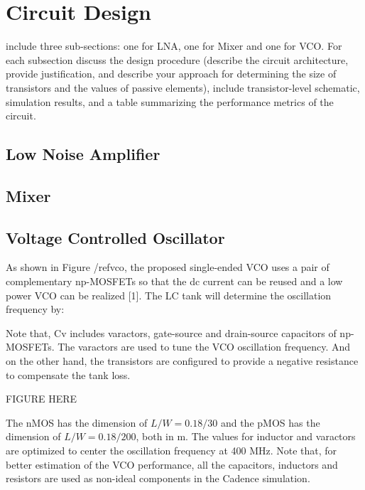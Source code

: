 \section{Circuit Design}
include three sub-sections: one for LNA, one for Mixer and one for VCO. For each subsection discuss the design procedure (describe the circuit architecture, provide justification, and describe your approach for determining the size of transistors and the values of passive elements), include transistor-level schematic, simulation results, and a table summarizing the performance metrics of the circuit.

\subsection{Low Noise Amplifier}

\subsection{Mixer}

\subsection{Voltage Controlled Oscillator}
As shown in Figure /ref{vco}, the proposed single-ended VCO uses a pair of complementary np-MOSFETs so that the dc current can be reused and a low power VCO can be realized [1]. The LC tank will determine the oscillation frequency by:


Note that, Cv includes varactors, gate-source and drain-source capacitors of np-MOSFETs. The varactors are used to tune the VCO oscillation frequency. And on the other hand, the transistors are configured to provide a negative resistance to compensate the tank loss. 

FIGURE HERE

The nMOS has the dimension of $L/W=0.18/30$ and the pMOS has the dimension of $L/W=0.18/200$, both in m. The values for inductor and varactors are optimized to center the oscillation frequency at 400 MHz. Note that, for better estimation of the VCO performance, all the capacitors, inductors and resistors are used as non-ideal components in the Cadence simulation. 

